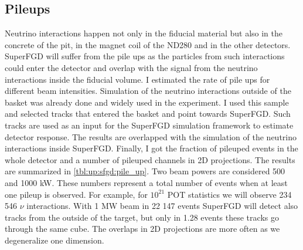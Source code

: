 \documentclass[main.tex]{subfiles}
\begin{document}
\subsection{Pileups}
\label{sec:up:sfgd:pu}
Neutrino interactions happen not only in the fiducial material but also in the concrete of the pit, in the magnet coil of the ND280 and in the other detectors. SuperFGD will suffer from the pile ups as the particles from such interactions could enter the detector and overlap with the signal from the neutrino interactions inside the fiducial volume. I estimated the rate of pile ups for different beam intensities. Simulation of the neutrino interactions outside of the basket was already done and widely used in the experiment. I used this sample and selected tracks that entered the basket and point towards SuperFGD. Such tracks are used as an input for the SuperFGD simulation framework to estimate detector response. The results are overlapped with the simulation of the neutrino interactions inside SuperFGD. Finally, I got the fraction of pileuped events in the whole detector and a number of pileuped channels in 2D projections. The results are summarized in \autoref{tbl:up:sfgd:pile_up}. Two beam powers are considered 500 and 1000 kW. These numbers represent a total number of events when at least one pileup is observed. For example, for $10^{21}$ POT statistics we will observe 234 546 $\nu$ interactions. With 1 MW beam in 22 147 events SuperFGD will detect also tracks from the outside of the target, but only in 1.28 events these tracks go through the same cube. The overlaps in 2D projections are more often as we degeneralize one dimension.
\end{document}
